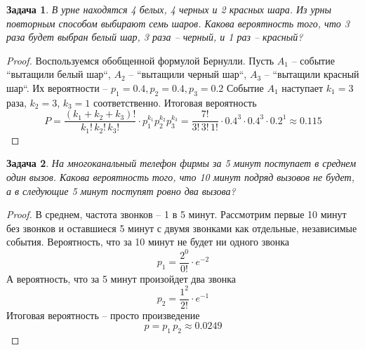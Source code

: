 \documentclass[a4paper,12pt]{article}
\newtheorem{problem}{Задача}
\newenvironment{solution}{\renewcommand{\proofname}{\unskip\indent\nopunct}\begin{proof}}{\end{proof}}
\begin{document}
\begin{problem}
В урне находятся 4 белых, 4 черных и 2 красных шара.
Из урны повторным способом выбирают семь шаров.
Какова вероятность того, что 3 раза будет выбран белый шар, 3 раза -- черный, и 1 раз -- красный?
\end{problem}
\begin{solution}
Воспользуемся обобщенной формулой Бернулли.
Пусть $A_1$ -- событие ``вытащили белый шар``, $A_2$ -- ``вытащили черный шар``, $A_3$ -- ``вытащили красный шар``.
Их вероятности -- $p_1 = 0.4, p_2 = 0.4, p_3 = 0.2$
Событие $A_1$ наступает $k_1 = 3$ раза, $k_2 = 3$, $k_3 = 1$ соответственно.
Итоговая вероятность $$P = \frac{(k_1+k_2+k_3)!}{k_1!\, k_2!\, k_3!} \cdot p_1^{k_1} p_2^{k_2} p_3^{k_3} = \frac{7!}{3!\,3!\,1!} \cdot 0.4^3\cdot0.4^3\cdot0.2^1 \approx 0.115$$
\end{solution}

\begin{problem}
На многоканальный телефон фирмы за 5 минут поступает в среднем один вызов.
Какова вероятность того, что 10 минут подряд вызовов не будет, а в следующие 5 минут поступят ровно два вызова?
\end{problem}
\begin{solution}
В среднем, частота звонков -- 1 в 5 минут.
Рассмотрим первые 10 минут без звонков и оставшиеся 5 минут с двумя звонками как отдельные, независимые события.
Вероятность, что за 10 минут не будет ни одного звонка $$p_1 = \frac{2^0}{0!} \cdot e^{-2}$$
А вероятность, что за 5 минут произойдет два звонка $$p_2 = \frac{1^2}{2!} \cdot e^{-1}$$
Итоговая вероятность -- просто произведение $$p = p_1\,p_2 \approx 0.0249$$
\end{solution}
\end{document}
